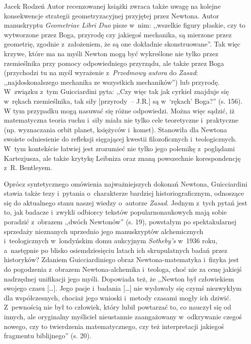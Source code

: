 \begin{recplenv}{Jacek Rodzeń}
Autor recenzowanej książki zwraca także uwagę na kolejne konsekwencje strategii geometryzacyjnej przyjętej przez
Newtona. Autor manuskryptu \textit{Geometriae Libri Duo} pisze w~nim: ,,wszelkie figury płaskie, czy to wytworzone przez
Boga, przyrodę czy jakiegoś mechanika, są mierzone przez geometrię, zgodnie z~założeniem, że są one dokładnie
skonstruowane''. Tak więc krzywe, które ma na myśli Newton mogą być wykreślone nie tylko przez rzemieślnika przy pomocy
odpowiedniego przyrządu, ale także przez Boga (przychodzi tu na myśl wyrażenie z~\textit{Przedmowy autora} do
\textit{Zasad}: ,,najdoskonalszego mechanika ze wszystkich mechaników'') lub przyrodę. W~związku z~tym Guicciardini pyta:
,,Czy więc tak jak cyrkiel znajduje się w~rękach rzemieślnika, tak siły [przyrody~-- J.R.] są w~‘rękach’ Boga?'' (s. 156).
W tym przypadku mogą nasuwać się różne odpowiedzi. Można więc sądzić, iż matematyczna teoria ruchu i~siły miała nie
tylko cele teoretyczne i~praktyczne (np. wyznaczania orbit planet, księżyców i~komet). Stanowiła dla Newtona swoiste
odniesienie do refleksji sięgającej kwestii filozoficznych i~teologicznych. W~tym kontekście łatwiej jest zrozumieć nie
tylko jego polemikę z~poglądami Kartezjusza, ale także krytykę Leibniza oraz znaną powszechnie
korespondencję z~R. Bentleyem.

Oprócz syntetycznego omówienia najważniejszych dokonań Newtona, Guicciardini stawia także
tezy i~pytania o~charakterze bardziej historiograficznym, odnoszące się do aktualnego stanu naszej
wiedzy o~autorze \textit{Zasad}.
Jednym z~tych pytań jest to, jak badacze i~zwykli odbiorcy tekstów popularnonaukowych mają sobie poradzić z~obrazem
,,dwóch Newtonów'' (s. 19), powstałym po spektakularnej sprzedaży nieznanych uprzednio jego manuskryptów
alchemicznych i~teologicznych w~londyńskim domu aukcyjnym \textit{Sotheby’s} w~1936 roku, a~następnie
po blisko osiemdziesięciu latach
ich skrupulatnych badań przez historyków? Zdaniem Guicciardiniego obraz Newtona-matematyka i~fizyka jest do
pogodzenia z~obrazem Newtona-alchemika i~teologa, choć nie za cenę jakiejś nadrzędnej unifikacji jego myśli.
Dopowiada też, że
,,Newton był człowiekiem swojego czasu […]. Jego pasje i~badania […] nie wydawały się czymś niezwykłym dla
współczesnych, chociaż jego wnioski i~metody czasami mogły ich dziwić. Z~pewnością nie był to człowiek, który lubił
powtarzać to, co nauczył się od innych, ale oryginalny myśliciel nieustannie zaangażowany w~odkrywanie czegoś nowego,
czy to twierdzenia matematycznego, czy też interpretacji jakiegoś fragmentu biblijnego'' (s. 20). 


\end{recplenv}

